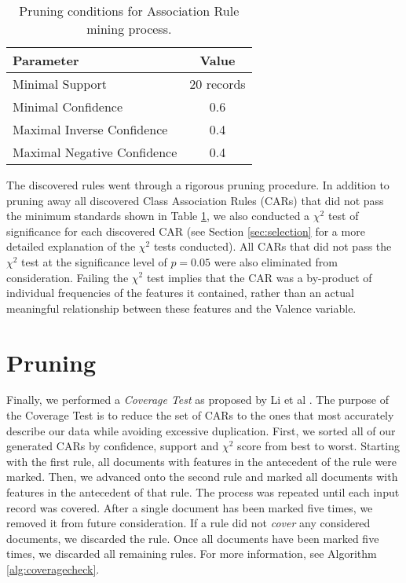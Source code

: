 \begin{table}
    \centering
    \begin{tabular}{|l|c|}
    \hline
    \textsf{Parameter} & \textsf{Value} \\
    \hline
    Minimal Support  &  20 records\\ 
    \hline
    Minimal Confidence & 0.6 \\
    Maximal Inverse Confidence & 0.4\\
    Maximal Negative Confidence& 0.4\\
    \hline
    \end{tabular}
    \caption{Pruning conditions for Association Rule mining process.}
    \label{tab:AR}
\end{table} 
 
  The discovered rules went through a rigorous pruning procedure. In addition
  to pruning away all discovered Class Association Rules (CARs) that did not
  pass the minimum standards shown in Table \ref{tab:AR}, we also conducted
  a $\chi^2$ test of significance for each discovered CAR (see Section \ref{sec:selection}
  for a more detailed explanation of the $\chi^2$ tests conducted). All CARs
  that did not pass the $\chi^2$ test at the significance level of
  $p=0.05$ were also eliminated from consideration. Failing
  the $\chi^2$ test implies that
  the CAR was a by-product of individual frequencies of the features it contained,
  rather than an actual meaningful relationship between these features and
  the \textsf{Valence} variable.
  
  \section{Pruning}
  
Finally, we performed a \textit{Coverage Test} as proposed by Li et al \cite{cmar}. The purpose of the \textsf{Coverage Test} is to reduce the set of CARs to the ones that most accurately describe our data while avoiding excessive duplication. First, we sorted all of our generated CARs by confidence, support and $\chi^2$ score from best to worst. Starting with the first rule, all documents with features in the antecedent of the rule were marked. Then, we advanced onto the second rule and marked all documents with features in the antecedent of that rule. The process was repeated until each input record was covered. After a single document has been marked five times, we removed it from future consideration. If a rule did not \textit{cover} any considered documents, we discarded the rule. Once all documents have been marked five times, we discarded all remaining rules. For more information, see Algorithm \ref{alg:coveragecheck}.
 

